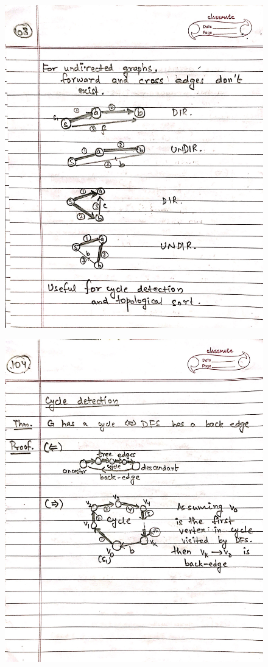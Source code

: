 \begin{figure}[H]
    \centering
    \includegraphics[scale=0.25]{"./MIT 6.006/MIT_6006_103"}
\end{figure}
\newpage
\begin{figure}[H]
    \centering
    \includegraphics[scale=0.25]{"./MIT 6.006/MIT_6006_104"}
\end{figure}
